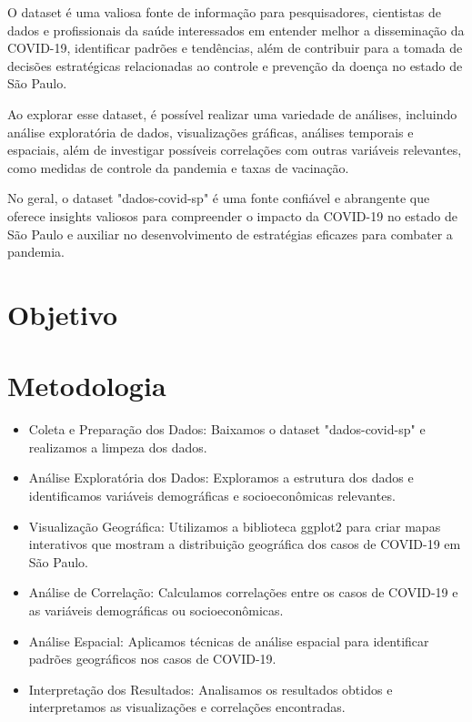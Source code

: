 \documentclass[12pt, 
oneside,		  
a4paper,			
english,			
brazil				 
]{article}
\begin{document}
O dataset é uma valiosa fonte de informação para pesquisadores, cientistas de dados e profissionais da saúde interessados em entender melhor a disseminação da COVID-19, identificar padrões e tendências, além de contribuir para a tomada de decisões estratégicas relacionadas ao controle e prevenção da doença no estado de São Paulo.

Ao explorar esse dataset, é possível realizar uma variedade de análises, incluindo análise exploratória de dados, visualizações gráficas, análises temporais e espaciais, além de investigar possíveis correlações com outras variáveis relevantes, como medidas de controle da pandemia e taxas de vacinação.

No geral, o dataset "dados-covid-sp" é uma fonte confiável e abrangente que oferece insights valiosos para compreender o impacto da COVID-19 no estado de São Paulo e auxiliar no desenvolvimento de estratégias eficazes para combater a pandemia.

\section{Objetivo}



\section{Metodologia}

\begin{itemize}
    \item Coleta e Preparação dos Dados: Baixamos o dataset "dados-covid-sp" e realizamos a limpeza dos dados.

    \item Análise Exploratória dos Dados: Exploramos a estrutura dos dados e identificamos variáveis demográficas e socioeconômicas relevantes.

    \item Visualização Geográfica: Utilizamos a biblioteca ggplot2 para criar mapas interativos que mostram a distribuição geográfica dos casos de COVID-19 em São Paulo.

    \item Análise de Correlação: Calculamos correlações entre os casos de COVID-19 e as variáveis demográficas ou socioeconômicas.

    \item Análise Espacial: Aplicamos técnicas de análise espacial para identificar padrões geográficos nos casos de COVID-19.

    \item Interpretação dos Resultados: Analisamos os resultados obtidos e interpretamos as visualizações e correlações encontradas.
\end{itemize}

\end{document}
